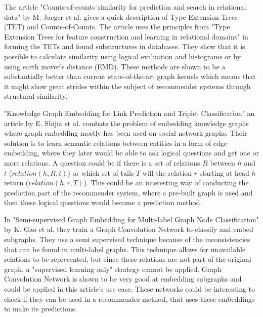 The article "Counts-of-counts similarity for prediction and search in relational data" by M. Jaeger et al.\cite{jaeger2019counts} gives a quick description of Type Extension Trees (TET) and Counts-of-Counts. 
The article uses the principles from "Type Extension Trees for feature construction and learning in relational domains" in forming the TETs and found substructures in databases. 
They show that it is possible to calculate similarity using logical evaluation and histograms or by using earth mover's distance (EMD). 
These methods are shown to be a substantially better than current state-of-the-art graph kernels which means that it might show great strides within the subject of recommender systems through structural similarity.

"Knowledge Graph Embedding for Link Prediction and Triplet Classification" an article by E. Shijia et al. \cite{10.1007/978-981-10-3168-7_23} combats the problem of embedding knowledge graphs where graph embedding mostly has been used on social network graphs. 
Their solution is to learn semantic relations between entities in a form of edge embedding, where they later would be able to ask logical questions and get one or more relations. 
A question could be if there is a set of relations $R$ between $h$ and $t$ ($relation(h,R,t)$) or which set of tails $T$ will the relation $r$ starting at head $h$ return ($relation(h,r,T)$). 
This could be an interesting way of conducting the prediction part of the recommender system, where a pre-built graph is used and then these logical questions would become a prediction method.

In "Semi-supervised Graph Embedding for Multi-label Graph Node Classification" by K. Gao et al.\cite{10.1007/978-3-030-34223-4_35} they train a Graph Convolution Network to classify and embed subgraphs. 
They use a semi supervised technique because of the inconsistencies that can be found in multi-label graphs. 
This technique allows for unavailable relations to be represented, but since these relations are not part of the original graph, a "supervised learning only" strategy cannot be applied. 
Graph Convolution Network is shown to be very good at embedding subgraphs and could be applied in this article's use case.
These networks could be interesting to check if they can be used in a recommender method, that uses these embeddings to make its predictions.
